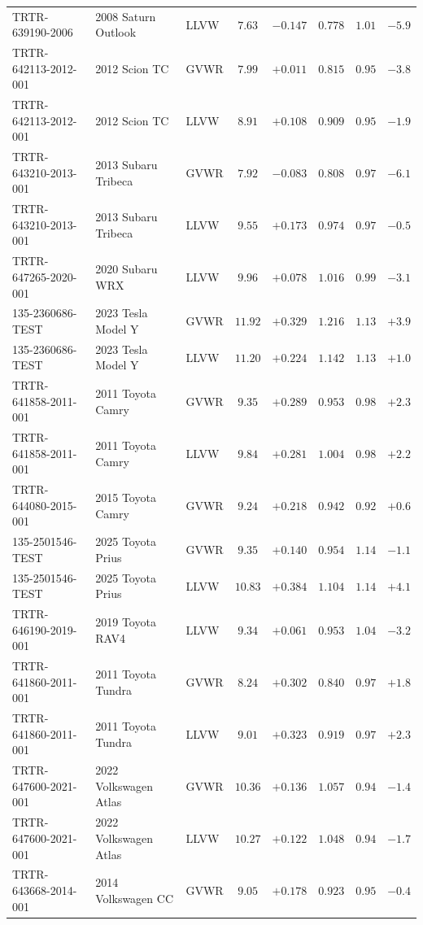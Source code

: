 \documentclass[12pt, twoside]{amsart}
\theoremstyle{definition}
\begin{document}
{\begin{longtable}{lp{2.9cm}lccccc}
TRTR-639190-2006 & 2008 Saturn Outlook & LLVW & $7.63$ & $-0.147$ & $0.778$ & $1.01$ & $-5.9$\\
TRTR-642113-2012-001 & 2012 Scion TC & GVWR & $7.99$ & $+0.011$ & $0.815$ & $0.95$ & $-3.8$\\
TRTR-642113-2012-001 & 2012 Scion TC & LLVW & $8.91$ & $+0.108$ & $0.909$ & $0.95$ & $-1.9$\\
TRTR-643210-2013-001 & 2013 Subaru Tribeca & GVWR & $7.92$ & $-0.083$ & $0.808$ & $0.97$ & $-6.1$\\
TRTR-643210-2013-001 & 2013 Subaru Tribeca & LLVW & $9.55$ & $+0.173$ & $0.974$ & $0.97$ & $-0.5$\\
TRTR-647265-2020-001 & 2020 Subaru WRX & LLVW & $9.96$ & $+0.078$ & $1.016$ & $0.99$ & $-3.1$\\
135-2360686-TEST & 2023 Tesla Model Y & GVWR & $11.92$ & $+0.329$ & $1.216$ & $1.13$ & $+3.9$\\
135-2360686-TEST & 2023 Tesla Model Y & LLVW & $11.20$ & $+0.224$ & $1.142$ & $1.13$ & $+1.0$\\
TRTR-641858-2011-001 & 2011 Toyota Camry & GVWR & $9.35$ & $+0.289$ & $0.953$ & $0.98$ & $+2.3$\\
TRTR-641858-2011-001 & 2011 Toyota Camry & LLVW & $9.84$ & $+0.281$ & $1.004$ & $0.98$ & $+2.2$\\
TRTR-644080-2015-001 & 2015 Toyota Camry & GVWR & $9.24$ & $+0.218$ & $0.942$ & $0.92$ & $+0.6$\\
135-2501546-TEST & 2025 Toyota Prius & GVWR & $9.35$ & $+0.140$ & $0.954$ & $1.14$ & $-1.1$\\
135-2501546-TEST & 2025 Toyota Prius & LLVW & $10.83$ & $+0.384$ & $1.104$ & $1.14$ & $+4.1$\\
TRTR-646190-2019-001 & 2019 Toyota RAV4 & LLVW & $9.34$ & $+0.061$ & $0.953$ & $1.04$ & $-3.2$\\
TRTR-641860-2011-001 & 2011 Toyota Tundra & GVWR & $8.24$ & $+0.302$ & $0.840$ & $0.97$ & $+1.8$\\
TRTR-641860-2011-001 & 2011 Toyota Tundra & LLVW & $9.01$ & $+0.323$ & $0.919$ & $0.97$ & $+2.3$\\
TRTR-647600-2021-001 & 2022 Volkswagen Atlas & GVWR & $10.36$ & $+0.136$ & $1.057$ & $0.94$ & $-1.4$\\
TRTR-647600-2021-001 & 2022 Volkswagen Atlas & LLVW & $10.27$ & $+0.122$ & $1.048$ & $0.94$ & $-1.7$\\
TRTR-643668-2014-001 & 2014 Volkswagen CC & GVWR & $9.05$ & $+0.178$ & $0.923$ & $0.95$ & $-0.4$\\

\end{longtable}}
\end{document}
